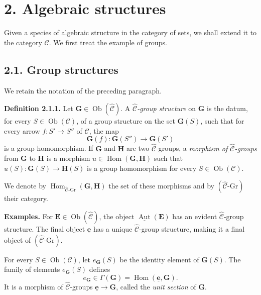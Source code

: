 \section*{2. Algebraic structures}

Given a species of algebraic structure in the category of sets, we shall
extend it to the category \(\mathscr C\). We first treat the example of
groups.

\subsection*{2.1. Group structures}

We retain the notation of the preceding paragraph.

\medskip
\noindent\textbf{Definition 2.1.1.}
Let \(\mathbf G\in\operatorname{Ob}(\widehat{\mathscr C})\). A
\emph{\(\widehat{\mathscr C}\)-group structure} on \(\mathbf G\) is the
datum, for every \(S\in\operatorname{Ob}(\mathscr C)\), of a group structure
on the set \(\mathbf G(S)\), such that for every arrow
\(f:S'\to S''\) of \(\mathscr C\), the map
\[
  \mathbf G(f):\mathbf G(S'')\longrightarrow\mathbf G(S')
\]
is a group homomorphism. If \(\mathbf G\) and \(\mathbf H\) are two
\(\widehat{\mathscr C}\)-groups, a \emph{morphism of
\(\widehat{\mathscr C}\)-groups} from \(\mathbf G\) to \(\mathbf H\) is a
morphism \(u\in\operatorname{Hom}(\mathbf G,\mathbf H)\) such that
\(u(S):\mathbf G(S)\to\mathbf H(S)\) is a group homomorphism for every
\(S\in\operatorname{Ob}(\mathscr C)\).

We denote by
\(\operatorname{Hom}_{\widehat{\mathscr C}\text{-}\mathrm{Gr}}
  (\mathbf G,\mathbf H)\)
the set of these morphisms and by
\((\widehat{\mathscr C}\text{-}\mathrm{Gr})\) their category.

\medskip
\noindent\textbf{Examples.}
For \(\mathbf E\in\operatorname{Ob}(\widehat{\mathscr C})\), the object
\(\underline{\operatorname{Aut}}(\mathbf E)\) has an evident
\(\widehat{\mathscr C}\)-group structure. The final object
\(\underline{\mathbf e}\) has a unique
\(\widehat{\mathscr C}\)-group structure, making it a final object of
\((\widehat{\mathscr C}\text{-}\mathrm{Gr})\).

For every \(S\in\operatorname{Ob}(\mathscr C)\), let
\(e_{\mathbf G}(S)\) be the identity element of \(\mathbf G(S)\). The family
of elements \(e_{\mathbf G}(S)\) defines
\[
  e_{\mathbf G}\in\Gamma(\mathbf G)
  =\operatorname{Hom}(\underline{\mathbf e},\mathbf G).
\]
It is a morphism of \(\widehat{\mathscr C}\)-groups
\(\underline{\mathbf e}\to\mathbf G\), called the \emph{unit section} of
\(\mathbf G\).

